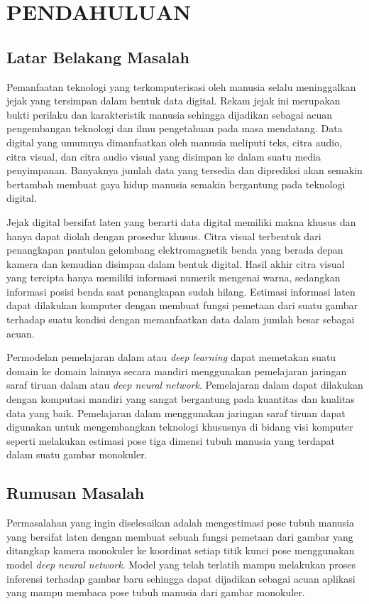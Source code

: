 
\chapter{PENDAHULUAN}
\label{cha:1-Pendahuluan}

\section{Latar Belakang Masalah}
\label{sec:1-LatarBelakangMasalah}

Pemanfaatan teknologi yang terkomputerisasi oleh manusia selalu meninggalkan jejak yang
tersimpan dalam bentuk data digital. Rekam jejak ini merupakan bukti perilaku dan karakteristik
manusia sehingga dijadikan sebagai acuan pengembangan teknologi dan ilmu pengetahuan pada masa mendatang.
Data digital yang umumnya dimanfaatkan oleh manusia meliputi teks, citra audio, citra visual, dan
citra audio visual yang disimpan ke dalam suatu media penyimpanan. Banyaknya jumlah data yang tersedia
dan diprediksi akan semakin bertambah membuat gaya hidup manusia semakin
bergantung pada teknologi digital.

Jejak digital bersifat laten yang berarti data digital memiliki makna khusus dan hanya dapat diolah
dengan prosedur khusus. Citra visual terbentuk dari penangkapan pantulan gelombang elektromagnetik
benda yang berada depan kamera dan kemudian disimpan dalam bentuk digital. Hasil akhir citra visual
yang tercipta hanya memiliki informasi numerik mengenai warna, sedangkan
informasi posisi benda saat penangkapan sudah hilang. Estimasi informasi laten dapat
dilakukan komputer dengan membuat fungsi pemetaan dari suatu gambar terhadap suatu kondisi dengan
memanfaatkan data dalam jumlah besar sebagai acuan.

Permodelan pemelajaran dalam atau \textit{deep learning} dapat memetakan suatu domain ke
domain lainnya secara mandiri menggunakan pemelajaran jaringan saraf tiruan dalam atau
\textit{deep neural network}. Pemelajaran dalam dapat dilakukan dengan komputasi mandiri yang
sangat bergantung pada kuantitas dan kualitas data yang baik.
Pemelajaran dalam menggunakan jaringan
saraf tiruan dapat digunakan untuk mengembangkan teknologi khususnya di bidang visi komputer
seperti melakukan estimasi pose tiga dimensi tubuh manusia yang terdapat dalam suatu gambar monokuler.

\section{Rumusan Masalah}
\label{sec:1-RumusanMasalah}
Permasalahan yang ingin diselesaikan adalah mengestimasi pose tubuh manusia yang
bersifat laten dengan membuat sebuah fungsi pemetaan dari gambar yang ditangkap kamera monokuler ke
koordinat setiap titik kunci pose menggunakan model \textit{deep neural network}.
Model yang telah terlatih mampu melakukan proses
inferensi terhadap gambar baru sehingga dapat dijadikan sebagai acuan aplikasi yang mampu membaca pose tubuh
manusia dari gambar monokuler.

